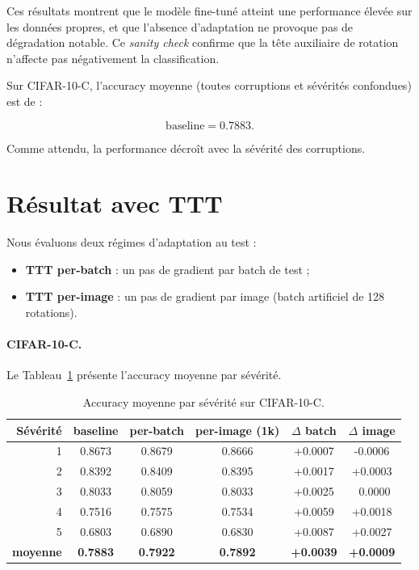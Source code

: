 \documentclass[12pt,a4paper]{report}
\begin{document}
	Ces résultats montrent que le modèle fine-tuné atteint une performance élevée sur les données propres, et que l’absence d’adaptation ne provoque pas de dégradation notable.  
	Ce \emph{sanity check} confirme que la tête auxiliaire de rotation n’affecte pas négativement la classification.
	
	Sur CIFAR-10-C, l’accuracy moyenne (toutes corruptions et sévérités confondues) est de :
	
	\[
	\text{baseline} = \mathbf{0.7883}.
	\]
	
	Comme attendu, la performance décroît avec la sévérité des corruptions.
	
	\section{Résultat avec TTT}
	Nous évaluons deux régimes d’adaptation au test :
	\begin{itemize}
		\item \textbf{TTT per-batch} : un pas de gradient par batch de test ;
		\item \textbf{TTT per-image} : un pas de gradient par image (batch artificiel de 128 rotations).
	\end{itemize}
	
	\paragraph{CIFAR-10-C.}  
	Le Tableau~\ref{tab:severity_ttt} présente l’accuracy moyenne par sévérité.
	
	\begin{table}[H]
		\centering
		\small
		\begin{tabular}{r|ccc|cc}
			\toprule
			Sévérité & baseline & per-batch & per-image (1k) & $\Delta$ batch & $\Delta$ image \\
			\midrule
			1 & 0.8673 & 0.8679 & 0.8666 & +0.0007 & -0.0006 \\
			2 & 0.8392 & 0.8409 & 0.8395 & +0.0017 & +0.0003 \\
			3 & 0.8033 & 0.8059 & 0.8033 & +0.0025 & ~0.0000 \\
			4 & 0.7516 & 0.7575 & 0.7534 & +0.0059 & +0.0018 \\
			5 & 0.6803 & 0.6890 & 0.6830 & +0.0087 & +0.0027 \\
			\midrule
			\textbf{moyenne} & \textbf{0.7883} & \textbf{0.7922} & \textbf{0.7892} & \textbf{+0.0039} & \textbf{+0.0009} \\
			\bottomrule
		\end{tabular}
		\caption{Accuracy moyenne par sévérité sur CIFAR-10-C.}
		\label{tab:severity_ttt}
	\end{table}
	
\end{document}
